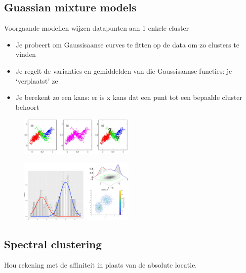 \documentclass{article}
\begin{document}
\subsection{Guassian mixture models}

Voorgaande modellen wijzen datapunten aan 1 enkele cluster

\begin{itemize}
    \item Je probeert om Gaussisaanse curves te fitten op de data om zo clusters te vinden
    \item Je regelt de varianties en gemiddelden van die Gaussisaanse functies: je `verplaatst' ze
    \item Je berekent zo een kans: er is x kans dat een punt tot een bepaalde cluster behoort 
\end{itemize}

\begin{figure}[H]
    \centering
    \includegraphics[width=0.5\textwidth]{guassian-mixture-models.png}
\end{figure}

\begin{figure}[H]
    \centering
    \includegraphics[width=0.5\textwidth]{guassian-mixture-models2.png}
\end{figure}

\subsection{Spectral clustering}

Hou rekening met de affiniteit in plaats van de absolute locatie.
\end{document}
